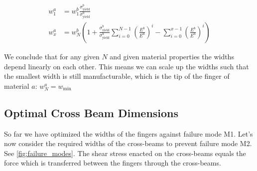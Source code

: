 \begin{align}
	w_1^a &= w_1^b \frac{\sigma^b_\text{yield}}{\sigma^a_\text{yield}} \label{eq:width_a_1} \\
	w^a_x &= w^b_N \left( 1 + \frac{\sigma^b_\text{yield}}{\sigma^a_\text{yield}} \sum\limits_{i=0}^{N-1} \left(\frac{E^b}{E^a}\right)^i  - \sum\limits_{i=0}^{x-1} \left(\frac{E^b}{E^a}\right)^i  \right) \label{eq:widths_a}
\end{align}

We conclude that for any given $N$ and given material properties the widths depend linearly on each other.
This means we can scale up the widths such that the smallest width is still manufacturable,
which is the tip of the finger of material $a$:
$w^a_N = w_\text{min}$







\subsection{Optimal Cross Beam Dimensions}
So far we have optimized the widths of the fingers against failure mode M1.
Let's now consider the required widths of the cross-beams to prevent failure mode M2.
See \cref{fig:failure_modes}.
The shear stress enacted on the cross-beams equals the force which is transferred between the fingers through the cross-beams.


